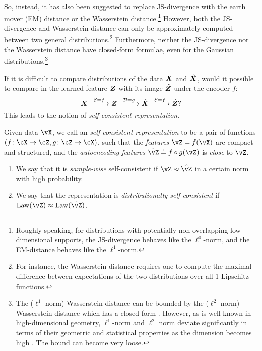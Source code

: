 \documentclass[../../book-main.tex]{subfiles}
\begin{document}
So, instead, it has also been suggested to replace JS-divergence with the earth mover (EM) distance or the Wasserstein distance.\footnote{Roughly speaking, for distributions with potentially non-overlapping low-dimensional supports, the JS-divergence behaves like the $\ell^0$-norm, and the EM-distance behaves like the $\ell^1$-norm.} However, both the JS-divergence and Wasserstein distance can only be approximately computed between two general distributions.\footnote{For instance, the Wasserstein distance requires one to compute the maximal difference between expectations of the two distributions over all 1-Lipschitz functions.} Furthermore, neither the JS-divergence nor the Wasserstein distance have closed-form formulae, even for the Gaussian distributions.\footnote{The ($\ell^1$-norm) Wasserstein distance can be bounded by the ($\ell^2$-norm) Wasserstein distance which has a closed-form \cite{salmona2021gromovwasserstein}. However, as is well-known in high-dimensional geometry, $\ell^1$-norm and $\ell^2$ norm deviate significantly in terms of their geometric and statistical properties as the dimension becomes high \cite{Wright-Ma-2021}. The bound can become very loose.} 

If it is difficult to compare distributions of the data $\bm{X}$ and $\hat {\bm{X}}$, would it possible to compare in the learned feature $\bm{Z}$ with its image $\hat {\bm{Z}}$ under the encoder $f$: 
\begin{equation}
 \bm{X}
\xrightarrow{\hspace{1mm} \mathcal{E} = f \hspace{1mm}} \bm{Z}  \xrightarrow{\hspace{1mm} \mathcal{D} = g \hspace{1mm}} \hat{\bm{X}} \xrightarrow{\hspace{1mm} \mathcal{E} = f \hspace{1mm}} \hat {\bm{Z}}?
\label{eqn:closed-autoencoding}
\end{equation}
This leads to the notion of {\em self-consistent representation}.
\begin{definition}\label{def:closed_loop}
    Given data \(\vX\), we call an \textit{self-consistent representation} to be a pair of functions \((f \colon \cX \to \cZ, g \colon \cZ \to \cX)\), such that the \textit{features} \(\vZ = f(\vX)\) are compact and structured, and the \textit{autoencoding features} \(\hat{\vZ} \doteq f \circ g(\vZ)\) is \textit{close} to \(\vZ\). 
    \begin{enumerate}
        \item We say that it is \textit{sample-wise} self-consistent if \(\vZ \approx \hat{\vZ}\) in a certain norm  with high probability.
        \item We say that the representation is \textit{distributionally self-consistent} if \(\Law(\vZ) \approx \Law(\hat{\vZ})\).
    \end{enumerate}
\end{definition}
\end{document}
